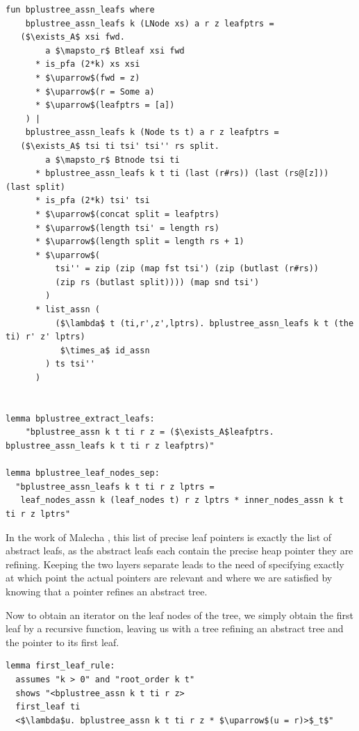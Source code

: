 \documentclass[a4paper,UKenglish,cleveref, autoref, thm-restate]{lipics-v2021}
\begin{document}
\begin{lstlisting}[mathescape=true, language=Isabelle,label=lst:btree-view-split]
fun bplustree_assn_leafs where
    bplustree_assn_leafs k (LNode xs) a r z leafptrs =
   ($\exists_A$ xsi fwd.
        a $\mapsto_r$ Btleaf xsi fwd
      * is_pfa (2*k) xs xsi
      * $\uparrow$(fwd = z)
      * $\uparrow$(r = Some a)
      * $\uparrow$(leafptrs = [a])
    ) |
    bplustree_assn_leafs k (Node ts t) a r z leafptrs =
   ($\exists_A$ tsi ti tsi' tsi'' rs split.
        a $\mapsto_r$ Btnode tsi ti
      * bplustree_assn_leafs k t ti (last (r#rs)) (last (rs@[z])) (last split)
      * is_pfa (2*k) tsi' tsi
      * $\uparrow$(concat split = leafptrs)
      * $\uparrow$(length tsi' = length rs)
      * $\uparrow$(length split = length rs + 1)
      * $\uparrow$(
          tsi'' = zip (zip (map fst tsi') (zip (butlast (r#rs))
          (zip rs (butlast split)))) (map snd tsi')
        )
      * list_assn (
          ($\lambda$ t (ti,r',z',lptrs). bplustree_assn_leafs k t (the ti) r' z' lptrs)
           $\times_a$ id_assn
        ) ts tsi''
      )


lemma bplustree_extract_leafs:
    "bplustree_assn k t ti r z = ($\exists_A$leafptrs. bplustree_assn_leafs k t ti r z leafptrs)"

lemma bplustree_leaf_nodes_sep:
  "bplustree_assn_leafs k t ti r z lptrs =
   leaf_nodes_assn k (leaf_nodes t) r z lptrs * inner_nodes_assn k t ti r z lptrs"
\end{lstlisting}

In the work of Malecha \cite{DBLP:conf/popl/MalechaMSW10}, 
this list of precise leaf pointers is exactly the list of abstract leafs,
as the abstract leafs each contain the precise heap pointer they are refining.
Keeping the two layers separate leads to the need of specifying
exactly at which point the actual pointers are relevant
and where we are satisfied by knowing that a pointer refines
an abstract tree.

Now to obtain an iterator on the leaf nodes of the tree,
we simply obtain the first leaf by a recursive function, leaving
us with a tree refining an abstract tree and the pointer to its first leaf.

\begin{lstlisting}[mathescape=true, language=Isabelle,label=lst:btree-first-leaf]
lemma first_leaf_rule:
  assumes "k > 0" and "root_order k t"
  shows "<bplustree_assn k t ti r z>
  first_leaf ti
  <$\lambda$u. bplustree_assn k t ti r z * $\uparrow$(u = r)>$_t$"
\end{lstlisting}
\end{document}
